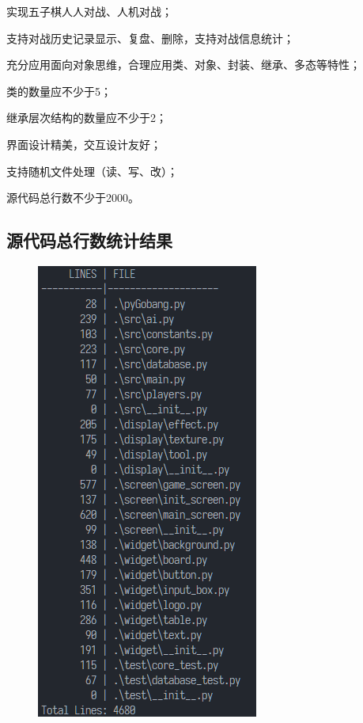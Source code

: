 \documentclass[a4paper, AutoFakeBold=2.17 ,zihao=-4]{ctexart}
\newcommand{\cmark}{\ding{51}}%
\newcommand{\done}{\rlap{$\square$}{\raisebox{2pt}{\large\hspace{1pt}\cmark}}%
\hspace{-2.5pt}}
\begin{document}
\begin{todolist}
    \item[\done] 实现五子棋人人对战、人机对战；
    \item[\done] 支持对战历史记录显示、复盘、删除，支持对战信息统计；
    \item[\done] 充分应用面向对象思维，合理应用类、对象、封装、继承、多态等特性；
    \begin{todolist}
        \item[\done] 类的数量应不少于5；
        \item[\done] 继承层次结构的数量应不少于2；
    \end{todolist}
    \item[\done] 界面设计精美，交互设计友好；
    \item[\done] 支持随机文件处理（读、写、改）；
    \item[\done] 源代码总行数不少于2000。
\end{todolist}

\subsection{源代码总行数统计结果}

\begin{figure}[H]
    \centering
    \includegraphics[width=.4\columnwidth]{Line Count}
\end{figure}
\end{document}
